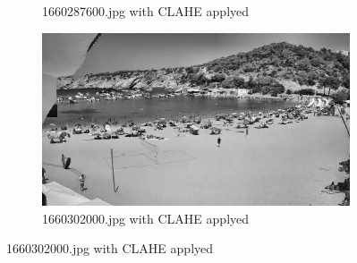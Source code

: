 \documentclass[10pt]{article}
\begin{document}
\begin{figure}[h]
\begin{subfigure}{0.25\textwidth}
    \caption{1660287600.jpg with CLAHE applyed}
    \label{fig:2}
  \end{subfigure}\hfil %
  \begin{subfigure}{0.25\textwidth}
    \includegraphics[width=\linewidth]{img/equ/1660302000.jpg}
    \caption{1660302000.jpg with CLAHE applyed}
    \label{fig:3}
  \end{subfigure}


\end{figure}
\end{document}
